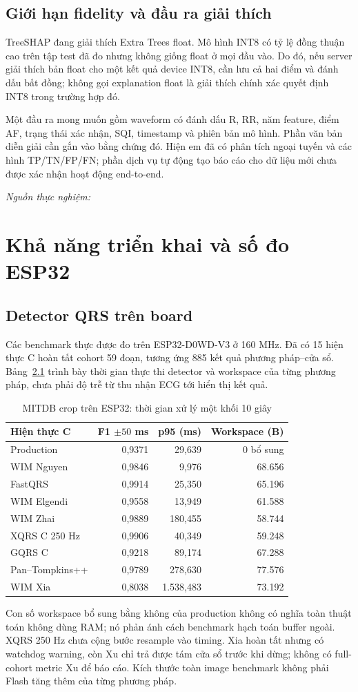 \documentclass[12pt,a4paper,oneside]{report}
\newcommand{\artifact}[1]{\par\noindent\textit{Nguồn thực nghiệm:}\ \path{#1}\par}
\begin{document}
\section{Giới hạn fidelity và đầu ra giải thích}
TreeSHAP đang giải thích Extra Trees float. Mô hình INT8 có tỷ lệ đồng thuận cao trên tập test đã đo nhưng không giống float ở mọi đầu vào. Do đó, nếu server giải thích bản float cho một kết quả device INT8, cần lưu cả hai điểm và đánh dấu bất đồng; không gọi explanation float là giải thích chính xác quyết định INT8 trong trường hợp đó.

Một đầu ra mong muốn gồm waveform có đánh dấu R, RR, năm feature, điểm AF, trạng thái xác nhận, SQI, timestamp và phiên bản mô hình. Phần văn bản diễn giải cần gắn vào bằng chứng đó. Hiện em đã có phân tích ngoại tuyến và các hình TP/TN/FP/FN; phần dịch vụ tự động tạo báo cáo cho dữ liệu mới chưa được xác nhận hoạt động end-to-end.
\artifact{experiment/report/AF_XAI_50_REPORT.md}

\chapter{Khả năng triển khai và số đo ESP32}
\section{Detector QRS trên board}
Các benchmark thực được đo trên ESP32-D0WD-V3 ở 160 MHz. Đã có 15 hiện thực C hoàn tất cohort 59 đoạn, tương ứng 885 kết quả phương pháp--cửa sổ. Bảng~\ref{tab:deviceqrs} trình bày thời gian thực thi detector và workspace của từng phương pháp, chưa phải độ trễ từ thu nhận ECG tới hiển thị kết quả.

\begin{table}[H]
\centering\small
\caption{MITDB crop trên ESP32: thời gian xử lý một khối 10 giây}\label{tab:deviceqrs}
\begin{tabular}{lrrr}
\toprule Hiện thực C & F1 $\pm50$ ms & p95 (ms) & Workspace (B)\\\midrule
Production & 0,9371 & 29,639 & 0 bổ sung\\
WIM Nguyen & 0,9846 & 9,976 & 68.656\\
FastQRS & 0,9914 & 25,350 & 65.196\\
WIM Elgendi & 0,9558 & 13,949 & 61.588\\
WIM Zhai & 0,9889 & 180,455 & 58.744\\
XQRS C 250 Hz & 0,9906 & 40,349 & 59.248\\
GQRS C & 0,9218 & 89,174 & 67.288\\
Pan--Tompkins++ & 0,9789 & 278,630 & 77.576\\
WIM Xia & 0,8038 & 1.538,483 & 73.192\\
\bottomrule
\end{tabular}
\end{table}
Con số workspace bổ sung bằng không của production không có nghĩa toàn thuật toán không dùng RAM; nó phản ánh cách benchmark hạch toán buffer ngoài. XQRS 250 Hz chưa cộng bước resample vào timing. Xia hoàn tất nhưng có watchdog warning, còn Xu chỉ trả được tám cửa sổ trước khi dừng; không có full-cohort metric Xu để báo cáo. Kích thước toàn image benchmark không phải Flash tăng thêm của từng phương pháp.
\end{document}
